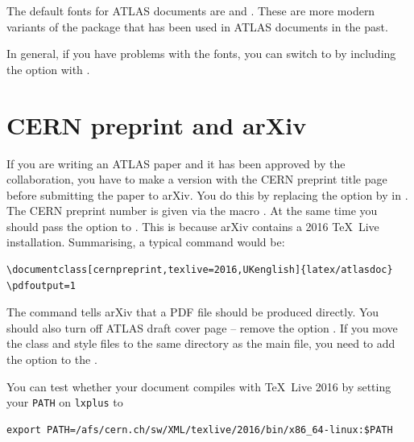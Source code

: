 The default fonts for ATLAS documents are  and .
These are more modern variants of the package  that has been used in
ATLAS documents in the past.

In general, if you have problems with the  fonts,
you can switch to  by including the option  with .


\section{CERN preprint and arXiv}
\label{sec:preprint}

If you are writing an ATLAS paper and it has been approved by the collaboration,
you have to make a version with the CERN preprint title page before submitting the paper to arXiv.
You do this by replacing the option  by  in .
The CERN preprint number is given via the macro .
At the same time you should pass the option  to
.
This is because arXiv contains a 2016 \TeX\ Live installation.
Summarising, a typical  command would be:
\begin{verbatim}
\documentclass[cernpreprint,texlive=2016,UKenglish]{latex/atlasdoc}
\pdfoutput=1
\end{verbatim}
The  command tells arXiv that a PDF file should be produced directly.
You should also turn off ATLAS draft cover page -- remove the option .
If you move the class and style files to the same directory as the main file,
you need to add the option  to the .

You can test whether your document compiles with \TeX\ Live 2016 by setting your \texttt{PATH} on \texttt{lxplus} to
\begin{verbatim}
export PATH=/afs/cern.ch/sw/XML/texlive/2016/bin/x86_64-linux:$PATH
\end{verbatim}

